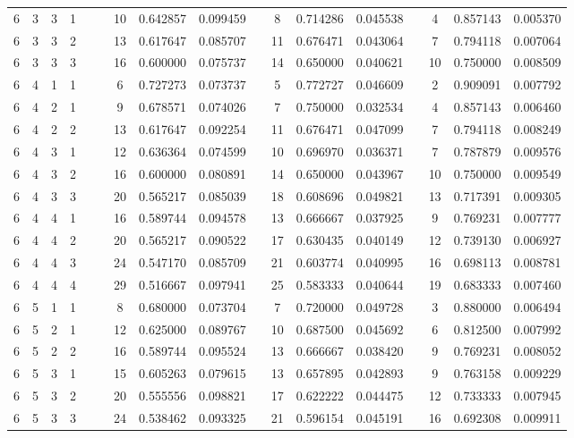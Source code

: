 \begin{appendix}
\begin{longtable}[h]{rrrcccccccccccccc}
6	&	3	&	3	&	1	&&&	10	&	0.642857	&	0.099459	&&	8	&	0.714286	&	0.045538	&&	4	&	0.857143	&	0.005370	\\
6	&	3	&	3	&	2	&&&	13	&	0.617647	&	0.085707	&&	11	&	0.676471	&	0.043064	&&	7	&	0.794118	&	0.007064	\\
6	&	3	&	3	&	3	&&&	16	&	0.600000	&	0.075737	&&	14	&	0.650000	&	0.040621	&&	10	&	0.750000	&	0.008509	\\
6	&	4	&	1	&	1	&&&	6	&	0.727273	&	0.073737	&&	5	&	0.772727	&	0.046609	&&	2	&	0.909091	&	0.007792	\\
6	&	4	&	2	&	1	&&&	9	&	0.678571	&	0.074026	&&	7	&	0.750000	&	0.032534	&&	4	&	0.857143	&	0.006460	\\
6	&	4	&	2	&	2	&&&	13	&	0.617647	&	0.092254	&&	11	&	0.676471	&	0.047099	&&	7	&	0.794118	&	0.008249	\\
6	&	4	&	3	&	1	&&&	12	&	0.636364	&	0.074599	&&	10	&	0.696970	&	0.036371	&&	7	&	0.787879	&	0.009576	\\
6	&	4	&	3	&	2	&&&	16	&	0.600000	&	0.080891	&&	14	&	0.650000	&	0.043967	&&	10	&	0.750000	&	0.009549	\\
6	&	4	&	3	&	3	&&&	20	&	0.565217	&	0.085039	&&	18	&	0.608696	&	0.049821	&&	13	&	0.717391	&	0.009305	\\
6	&	4	&	4	&	1	&&&	16	&	0.589744	&	0.094578	&&	13	&	0.666667	&	0.037925	&&	9	&	0.769231	&	0.007777	\\
6	&	4	&	4	&	2	&&&	20	&	0.565217	&	0.090522	&&	17	&	0.630435	&	0.040149	&&	12	&	0.739130	&	0.006927	\\
6	&	4	&	4	&	3	&&&	24	&	0.547170	&	0.085709	&&	21	&	0.603774	&	0.040995	&&	16	&	0.698113	&	0.008781	\\
6	&	4	&	4	&	4	&&&	29	&	0.516667	&	0.097941	&&	25	&	0.583333	&	0.040644	&&	19	&	0.683333	&	0.007460	\\
6	&	5	&	1	&	1	&&&	8	&	0.680000	&	0.073704	&&	7	&	0.720000	&	0.049728	&&	3	&	0.880000	&	0.006494	\\
6	&	5	&	2	&	1	&&&	12	&	0.625000	&	0.089767	&&	10	&	0.687500	&	0.045692	&&	6	&	0.812500	&	0.007992	\\
6	&	5	&	2	&	2	&&&	16	&	0.589744	&	0.095524	&&	13	&	0.666667	&	0.038420	&&	9	&	0.769231	&	0.008052	\\
6	&	5	&	3	&	1	&&&	15	&	0.605263	&	0.079615	&&	13	&	0.657895	&	0.042893	&&	9	&	0.763158	&	0.009229	\\
6	&	5	&	3	&	2	&&&	20	&	0.555556	&	0.098821	&&	17	&	0.622222	&	0.044475	&&	12	&	0.733333	&	0.007945	\\
6	&	5	&	3	&	3	&&&	24	&	0.538462	&	0.093325	&&	21	&	0.596154	&	0.045191	&&	16	&	0.692308	&	0.009911	\\

\end{longtable}
\end{appendix}
